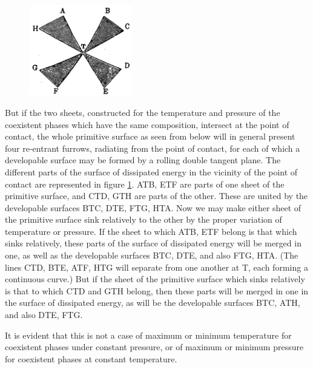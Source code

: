\documentclass[12pt]{article}
\begin{document}
\begin{figure} %
    \centering
    \includegraphics[width=0.4\textwidth]{fig_7}
    \caption{ }
    \label{fig_7}
\end{figure} 
But if the two sheets, constructed for the temperature and pressure of the
coexistent phases which have the same composition, intersect at the point of contact, the whole primitive surface as seen from below will in general present four re-entrant furrows, radiating from the point of contact, for each of which a developable surface may be formed by a rolling double tangent plane. The different parts of the surface of dissipated energy in the vicinity of the point of contact are represented in figure \ref{fig_7}. ATB, ETF are parts of one sheet of the primitive surface, and CTD, GTH are parts of the other. These are united by the developable surfaces BTC, 
DTE, FTG, HTA. Now we may make either sheet of the primitive surface sink relatively to the other by the proper variation of temperature or pressure. If the sheet to which ATB, ETF belong is that which sinks relatively, these parts of the surface of dissipated energy will be merged in one, as well as the developable surfaces BTC, DTE, and also FTG, HTA. (The lines CTD, BTE, ATF, HTG will separate from one another at T, each forming a continuous curve.) But if the sheet of the primitive surface which sinks relatively is that to which CTD and GTH belong, then these parts will be merged in one in the surface of dissipated energy, as will be the developable surfaces BTC, ATH, and also DTE, FTG.


It is evident that this is not a case of maximum or minimum temperature for coexistent phases under constant pressure, or of maximum or minimum pressure for coexistent phases at constant temperature.
\end{document}
